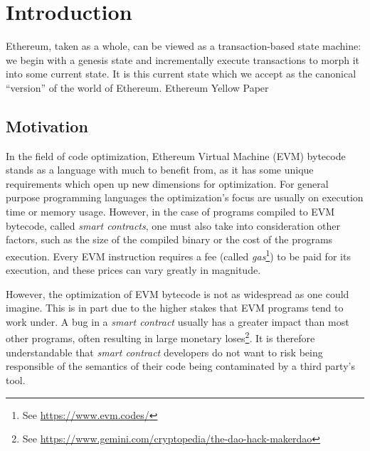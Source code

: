 \chapter{Introduction}
\label{cap:introduction}

\chapterquote
{Ethereum, taken as a whole, can be viewed as a transaction-based state machine: we begin with a genesis state and incrementally execute transactions to morph it into some current state. It is this current state which we accept as the canonical “version” of the world of Ethereum.}
{Ethereum Yellow Paper \cite{wood2014ethereum}}

\section{Motivation}
\label{sect:motivation}



In the field of code optimization, Ethereum Virtual Machine (EVM) bytecode stands as a language with 
much to benefit from, as it has some unique requirements which open up new dimensions for optimization.
For general purpose programming languages the optimization's focus are usually on execution time or 
memory usage. However, in the case of programs compiled to EVM bytecode, called \emph{smart contracts},
one must also take into consideration other factors, such as the size of the compiled binary or the cost
of the programs execution. Every EVM instruction requires a fee (called \emph{gas}\footnote{See 
\url{https://www.evm.codes/}}) to be paid for its execution, and these prices can vary greatly in 
magnitude.


However, the optimization of EVM bytecode is not as widespread as one could imagine. This is in part
due to the higher stakes that EVM programs tend to work under. A bug in a \emph{smart contract} usually
has a greater impact than most other programs, often resulting in large monetary loses\footnote{See 
\url{https://www.gemini.com/cryptopedia/the-dao-hack-makerdao}}. It is therefore understandable that 
\emph{smart contract} developers do not want to risk being responsible of the semantics of their code
being contaminated by a third party's tool.


